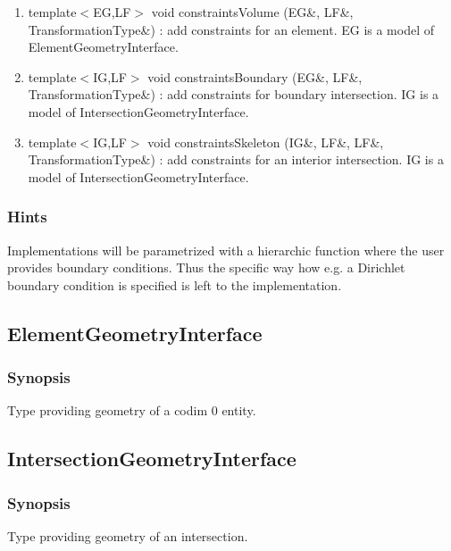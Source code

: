 \documentclass[11pt,a4paper,DIV11,%
notitlepage,oneside,abstracton,%
bibtotoc]{scrartcl}
\begin{document}
\begin{enumerate}[1)]
\item template$<$EG,LF$>$ void constraintsVolume (EG\&,
  LF\&, TransformationType\&) : add constraints for an element. EG is
  a model of ElementGeometryInterface.
\item template$<$IG,LF$>$ void constraintsBoundary (EG\&,
  LF\&, TransformationType\&) : add constraints for boundary
  intersection. IG is a model of IntersectionGeometryInterface.
\item template$<$IG,LF$>$ void constraintsSkeleton (IG\&,
  LF\&, LF\&, TransformationType\&) : add constraints for an
  interior intersection. IG is a model of IntersectionGeometryInterface.
\end{enumerate}

\subsubsection{Hints}

Implementations will be parametrized with a hierarchic function where
the user provides boundary conditions. Thus the specific way how
e.g. a Dirichlet boundary condition is specified is left to the
implementation. 


\subsection{ElementGeometryInterface}

\subsubsection{Synopsis}

Type providing geometry of a codim 0 entity.



\subsection{IntersectionGeometryInterface}

\subsubsection{Synopsis}

Type providing geometry of an intersection. 
\end{document}
